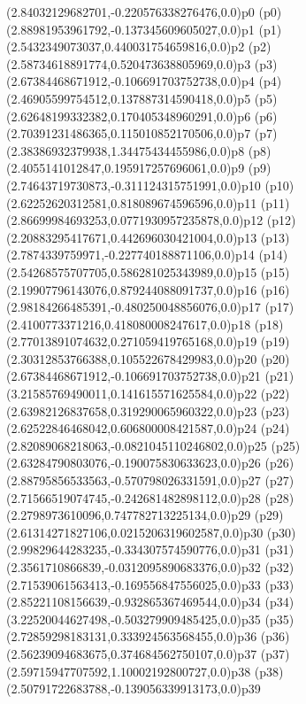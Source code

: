 \psPoint(2.84032129682701,-0.220576338276476,0.0){p0}
\psdot(p0)
\psPoint(2.88981953961792,-0.137345609605027,0.0){p1}
\psdot(p1)
\psPoint(2.5432349073037,0.440031754659816,0.0){p2}
\psdot(p2)
\psPoint(2.58734618891774,0.520473638805969,0.0){p3}
\psdot(p3)
\psPoint(2.67384468671912,-0.106691703752738,0.0){p4}
\psdot(p4)
\psPoint(2.46905599754512,0.137887314590418,0.0){p5}
\psdot(p5)
\psPoint(2.62648199332382,0.170405348960291,0.0){p6}
\psdot(p6)
\psPoint(2.70391231486365,0.115010852170506,0.0){p7}
\psdot(p7)
\psPoint(2.38386932379938,1.34475434455986,0.0){p8}
\psdot(p8)
\psPoint(2.4055141012847,0.195917257696061,0.0){p9}
\psdot(p9)
\psPoint(2.74643719730873,-0.311124315751991,0.0){p10}
\psdot(p10)
\psPoint(2.62252620312581,0.818089674596596,0.0){p11}
\psdot(p11)
\psPoint(2.86699984693253,0.0771930957235878,0.0){p12}
\psdot(p12)
\psPoint(2.20883295417671,0.442696030421004,0.0){p13}
\psdot(p13)
\psPoint(2.7874339759971,-0.227740188871106,0.0){p14}
\psdot(p14)
\psPoint(2.54268575707705,0.586281025343989,0.0){p15}
\psdot(p15)
\psPoint(2.19907796143076,0.879244088091737,0.0){p16}
\psdot(p16)
\psPoint(2.98184266485391,-0.480250048856076,0.0){p17}
\psdot(p17)
\psPoint(2.4100773371216,0.418080008247617,0.0){p18}
\psdot(p18)
\psPoint(2.77013891074632,0.271059419765168,0.0){p19}
\psdot(p19)
\psPoint(2.30312853766388,0.105522678429983,0.0){p20}
\psdot(p20)
\psPoint(2.67384468671912,-0.106691703752738,0.0){p21}
\psdot(p21)
\psPoint(3.21585769490011,0.141615571625584,0.0){p22}
\psdot(p22)
\psPoint(2.63982126837658,0.319290065960322,0.0){p23}
\psdot(p23)
\psPoint(2.62522846468042,0.606800008421587,0.0){p24}
\psdot(p24)
\psPoint(2.82089068218063,-0.0821045110246802,0.0){p25}
\psdot(p25)
\psPoint(2.63284790803076,-0.190075830633623,0.0){p26}
\psdot(p26)
\psPoint(2.88795856533563,-0.570798026331591,0.0){p27}
\psdot(p27)
\psPoint(2.71566519074745,-0.242681482898112,0.0){p28}
\psdot(p28)
\psPoint(2.2798973610096,0.747782713225134,0.0){p29}
\psdot(p29)
\psPoint(2.61314271827106,0.0215206319602587,0.0){p30}
\psdot(p30)
\psPoint(2.99829644283235,-0.334307574590776,0.0){p31}
\psdot(p31)
\psPoint(2.3561710866839,-0.0312095890683376,0.0){p32}
\psdot(p32)
\psPoint(2.71539061563413,-0.169556847556025,0.0){p33}
\psdot(p33)
\psPoint(2.85221108156639,-0.932865367469544,0.0){p34}
\psdot(p34)
\psPoint(3.22520044627498,-0.503279909485425,0.0){p35}
\psdot(p35)
\psPoint(2.72859298183131,0.333924563568455,0.0){p36}
\psdot(p36)
\psPoint(2.56239094683675,0.374684562750107,0.0){p37}
\psdot(p37)
\psPoint(2.59715947707592,1.10002192800727,0.0){p38}
\psdot(p38)
\psPoint(2.50791722683788,-0.139056339913173,0.0){p39}
